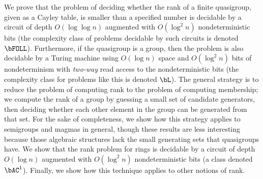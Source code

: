 \begin{wrapfigure}{r}{0pt}
\end{wrapfigure}
%
We prove that the problem of deciding whether the rank of a finite quasigroup, given as a Cayley table, is smaller than a specified number is decidable by a circuit of depth $O(\log \log n)$ augmented with $O(\log^2 n)$ nondeterministic bits (the complexity class of problems decidable by such circuits is denoted $\bFOLL$).
Furthermore, if the quasigroup is a group, then the problem is also decidable by a Turing machine using $O(\log n)$ space and $O(\log^2 n)$ bits of nondeterminism with \emph{two-way} read access to the nondeterministic bits (the complexity class for problems like this is denoted $\bL$).
The general strategy is to reduce the problem of computing rank to the problem of computing membership; we compute the rank of a group by guessing a small set of candidate generators, then deciding whether each other element in the group can be generated from that set.
For the sake of completeness, we show how this strategy applies to semigroups and magmas in general, though these results are less interesting because those algebraic structures lack the small generating sets that quasigroups have.
We show that the rank problem for rings is decidable by a circuit of depth $O(\log n)$ augmented with $O(\log^2 n)$ nondeterministic bits (a class denoted $\bAC^1$).
Finally, we show how this technique applies to other notions of rank.

